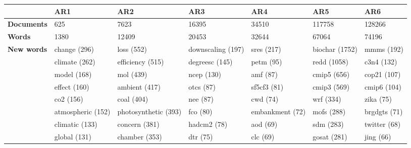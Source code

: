 \begin{tabular}{l p{1.8cm} p{1.8cm} p{1.8cm} p{1.8cm} p{1.8cm} p{1.8cm}} 
&\textbf{AR1} & \textbf{AR2} & \textbf{AR3} & \textbf{AR4} & \textbf{AR5} & \textbf{AR6}\\ \hline\textbf{Documents} &625 & 7623 & 16395 & 34510 & 117758 & 128266\\ 
\textbf{Words} &1380 & 12409 & 20453 & 32644 & 67064 & 74196\\ 
\textbf{New words} & change (296) & loss (552) & downscaling (197) & sres (217) & biochar (1752) & mmms (192)\\ & climate (262) & efficiency (515) & degreesc (145) & petm (95) & redd (1058) & c3n4 (132)\\ & model (168) & mol (439) & ncep (130) & amf (87) & cmip5 (656) & cop21 (107)\\ & effect (160) & ambient (417) & otcs (87) & sf5cf3 (81) & cmip3 (569) & cmip6 (104)\\ & co2 (156) & coal (404) & nee (87) & cwd (74) & wrf (334) & zika (75)\\ & atmospheric (152) & photosynthetic (393) & fco (80) & embankment (72) & mofs (288) & brgdgts (71)\\ & climatic (133) & concern (381) & hadcm2 (78) & aod (69) & sdm (283) & twitter (68)\\ & global (131) & chamber (353) & dtr (75) & clc (69) & gosat (281) & jing (66)
\end{tabular}